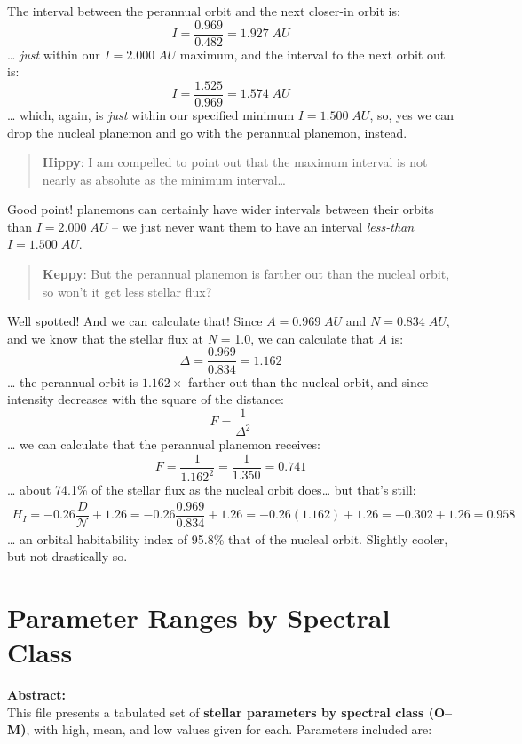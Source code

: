 \documentclass[
  letterpaper,
]{book}
\begin{document}
The interval between the perannual orbit and the next closer-in orbit
is: \[
I = \dfrac{0.969}{0.482} = 1.927\;AU
\] \ldots{} \emph{just} within our \(I = 2.000\;AU\) maximum, and the
interval to the next orbit out is: \[
I = \dfrac{1.525}{0.969} = 1.574\;AU
\] \ldots{} which, again, is \emph{just} within our specified minimum
\(I = 1.500\;AU\), so, yes we can drop the nucleal planemon and go with
the perannual planemon, instead.

\begin{quote}
\textbf{Hippy}: I am compelled to point out that the maximum interval is
not nearly as absolute as the minimum interval\ldots{}
\end{quote}

Good point! planemons can certainly have wider intervals between their
orbits than \(I = 2.000\;AU\) -- we just never want them to have an
interval \emph{less-than} \(I = 1.500\;AU\).

\begin{quote}
\textbf{Keppy}: But the perannual planemon is farther out than the
nucleal orbit, so won't it get less stellar flux?
\end{quote}

Well spotted! And we can calculate that! Since \(A = 0.969\;AU\) and
\(N = 0.834\;AU\), and we know that the stellar flux at \emph{N} = 1.0,
we can calculate that \emph{A} is: \[
\Delta = \dfrac{0.969}{0.834} = 1.162
\] \ldots{} the perannual orbit is \(1.162 \times\) farther out than the
nucleal orbit, and since intensity decreases with the square of the
distance: \[
F = \dfrac{1}{\Delta^2}
\] \ldots{} we can calculate that the perannual planemon receives: \[
F = \dfrac{1}{1.162^2}= \dfrac{1}{1.350} = 0.741
\] \ldots{} about 74.1\% of the stellar flux as the nucleal orbit
does\ldots{} but that's still: \[
\begin{gather}
H_I = -0.26\dfrac{D}{\mathcal{N}} + 1.26 = -0.26\dfrac{0.969}{0.834} + 1.26 = -0.26(1.162) + 1.26 = -0.302 + 1.26 = 0.958
\end{gather}
\] \ldots{} an orbital habitability index of 95.8\% that of the nucleal
orbit. Slightly cooler, but not drastically so.

\section{Parameter Ranges by Spectral
Class}\label{parameter-ranges-by-spectral-class-1}

\textbf{Abstract:}\\
This file presents a tabulated set of \textbf{stellar parameters by
spectral class (O--M)}, with high, mean, and low values given for each.
Parameters included are:
\end{document}
